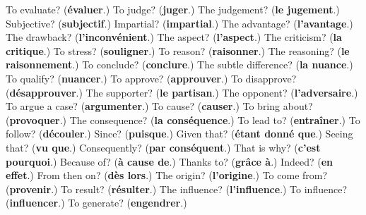 \begin{tcolorbox}[breakable,colback=teal!4,colframe=teal!35!black,title={Before you move on}]
To evaluate? (\textbf{évaluer}.) To judge? (\textbf{juger}.) The judgement? (\textbf{le jugement}.) Subjective? (\textbf{subjectif}.) Impartial? (\textbf{impartial}.) The advantage? (\textbf{l'avantage}.) The drawback? (\textbf{l'inconvénient}.) The aspect? (\textbf{l'aspect}.) The criticism? (\textbf{la critique}.) To stress? (\textbf{souligner}.) To reason? (\textbf{raisonner}.) The reasoning? (\textbf{le raisonnement}.) To conclude? (\textbf{conclure}.) The subtle difference? (\textbf{la nuance}.) To qualify? (\textbf{nuancer}.) To approve? (\textbf{approuver}.) To disapprove? (\textbf{désapprouver}.) The supporter? (\textbf{le partisan}.) The opponent? (\textbf{l'adversaire}.) To argue a case? (\textbf{argumenter}.) To cause? (\textbf{causer}.) To bring about? (\textbf{provoquer}.) The consequence? (\textbf{la conséquence}.) To lead to? (\textbf{entraîner}.) To follow? (\textbf{découler}.) Since? (\textbf{puisque}.) Given that? (\textbf{étant donné que}.) Seeing that? (\textbf{vu que}.) Consequently? (\textbf{par conséquent}.) That is why? (\textbf{c'est pourquoi}.) Because of? (\textbf{à cause de}.) Thanks to? (\textbf{grâce à}.) Indeed? (\textbf{en effet}.) From then on? (\textbf{dès lors}.) The origin? (\textbf{l'origine}.) To come from? (\textbf{provenir}.) To result? (\textbf{résulter}.) The influence? (\textbf{l'influence}.) To influence? (\textbf{influencer}.) To generate? (\textbf{engendrer}.)
\end{tcolorbox}
